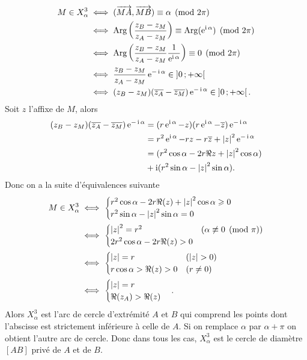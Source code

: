 \begin{align}
  M \in X_{\alpha}^3 & \iff (\overrightarrow{MA},\overrightarrow{MB}) \equiv \alpha \pmod {2\pi} \\
& \iff \operatorname{Arg}\left(\frac{z_B-z_M}{z_A-z_M}\right) \equiv \operatorname{Arg}(\operatorname{e}^{\operatorname{i} \alpha}) \pmod {2\pi}\\
& \iff \operatorname{Arg}\left(\frac{z_B-z_M}{z_A-z_M} \frac{1}{\operatorname{e}^{\operatorname{i} \alpha}}\right) \equiv 0 \pmod {2\pi}\\
& \iff \frac{z_B-z_M}{z_A-z_M} \operatorname{e}^{-\operatorname{i} \alpha} \in \left] 0 \, ;  +\infty \right[\\
& \iff (z_B-z_M)(\overline{z_A}-\overline{z_M})\operatorname{e}^{-\operatorname{i} \alpha} \in \left] 0 \, ;  +\infty \right[.
\end{align}
Soit $z$ l'affixe de $M$, alors
\begin{align}
  (z_B-z_M)(\overline{z_A}-\overline{z_M})\operatorname{e}^{-\operatorname{i} \alpha} & = (r\operatorname{e}^{\operatorname{i} \alpha} - z)(r\operatorname{e}^{\operatorname{i} \alpha} - \overline{z})\operatorname{e}^{-\operatorname{i} \alpha}\\
&=r^2 \operatorname{e}^{\operatorname{i} \alpha} -rz-r\overline{z}+\left\lvert z\right\rvert^2\operatorname{e}^{-\operatorname{i} \alpha}\\
&=(r^2\cos \alpha - 2r\Re{z}+\left\lvert z\right\rvert^2\cos \alpha) \\ 
&+ \operatorname{i}(r^2\sin \alpha - \left\lvert z\right\rvert^2\sin \alpha).
\end{align}
Donc on a la suite d'équivalences suivante
\begin{align}
  M \in X_{\alpha}^3 & \iff \begin{cases} r^2\cos \alpha - 2r\Re(z)+\left\lvert z\right\rvert^2\cos \alpha \geqslant 0 \\ r^2\sin \alpha - \left\lvert z\right\rvert^2\sin \alpha  = 0\end{cases}\\
& \iff \begin{cases}\left\lvert z\right\rvert^2=r^2 & (\alpha \not\equiv 0 \pmod {\pi}) \\ 2r^2\cos \alpha - 2r \Re(z)>0&\end{cases}\\
& \iff \begin{cases}\left\lvert z\right\rvert=r & (\left\lvert z\right\rvert>0)\\ r\cos \alpha > \Re(z)>0& (r\neq 0)\end{cases}\\
& \iff \begin{cases}\left\lvert z\right\rvert=r \\ \Re(z_A) > \Re(z)\end{cases}.
\end{align}
Alors $X_{\alpha}^{3}$ est l'arc de cercle d'extrémité $A$ et $B$ qui comprend les points dont l'abscisse est strictement inférieure à celle de $A$. Si on remplace $\alpha$ par $\alpha+\pi$ on obtient l'autre arc de cercle. Donc dans tous les cas, $X_{\alpha}^3$ est le cercle de diamètre $[AB]$ privé de $A$ et de $B$.

